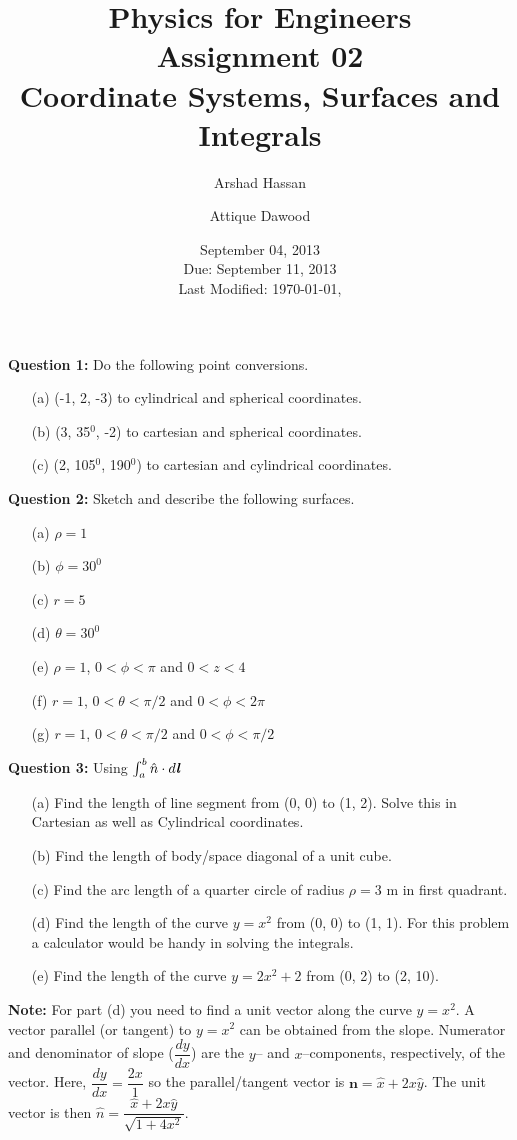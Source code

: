 \documentclass[12pt,a4paper]{article}
\title{\vspace{-3cm}Physics for Engineers\\Assignment 02\\Coordinate Systems, Surfaces and Integrals}
\author{Arshad Hassan\and Attique Dawood}
\date{September 04, 2013\\Due: September 11, 2013\\[0.2cm] Last Modified: \today, \currenttime}
\begin{document}
\maketitle
\noindent\textbf{Question 1:} Do the following point conversions.
\begin{itemize}
\item[(a)] (-1, 2, -3) to cylindrical and spherical coordinates.
\item[(b)] (3, 35$^0$, -2) to cartesian and spherical coordinates.
\item[(c)] (2, 105$^0$, 190$^0$) to cartesian and cylindrical coordinates.
\end{itemize}
\noindent\textbf{Question 2:} Sketch and describe the following surfaces.
\begin{itemize}
\item[(a)] $\rho=1$
\item[(b)] $\phi=30^0$
\item[(c)] $r=5$
\item[(d)] $\theta=30^0$
\item[(e)] $\rho=1$, $0<\phi<\pi$ and $0<z<4$
\item[(f)] $r=1$, $0<\theta<\pi/2$ and $0<\phi<2\pi$
\item[(g)] $r=1$, $0<\theta<\pi/2$ and $0<\phi<\pi/2$
\end{itemize}
\noindent\textbf{Question 3:} Using $\int_{a}^{b}\hat n\cdot d\textbf{\textit{l}}$
\begin{itemize}
\item[(a)] Find the length of line segment from (0, 0) to (1, 2). Solve this in Cartesian as well as Cylindrical coordinates.
\item[(b)] Find the length of body/space diagonal of a unit cube.
\item[(c)] Find the arc length of a quarter circle of radius $\rho=3$ m in first quadrant.
\item[(d)] Find the length of the curve $y=x^2$ from (0, 0) to (1, 1). For this problem a calculator would be handy in solving the integrals.
\item[(e)] Find the length of the curve $y=2x^2+2$ from (0, 2) to (2, 10).
\end{itemize}
\noindent\textbf{Note:} For part (d) you need to find a unit vector along the curve $y=x^2$. A vector parallel (or tangent) to $y=x^2$ can be obtained from the slope. Numerator and denominator of slope ($\dfrac{dy}{dx}$) are the $y$-- and $x$--components, respectively, of the vector. Here, $\dfrac{dy}{dx}=\dfrac{2x}{1}$ so the parallel/tangent vector is $\textbf{n}=\hat x+2x\hat y$. The unit vector is then $\hat n=\dfrac{\hat x+2x\hat y}{\sqrt{1+4x^2}}$.\\[0.2cm]
\end{document}

